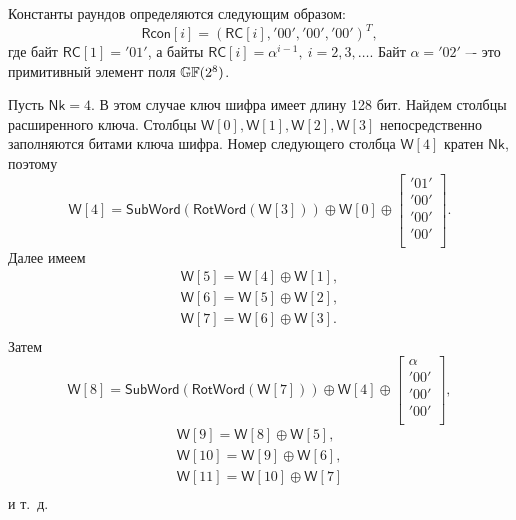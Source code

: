 Константы раундов определяются следующим образом:
    \[ \mathsf{Rcon}[i] = (\mathsf{RC}[i], \mathrm{'00'}, \mathrm{'00'}, \mathrm{'00'})^T, \]
где байт $\mathsf{RC}[1] = \mathrm{'01'}$, а байты $\mathsf{RC}[i] = \alpha^{i-1}, ~ i = 2, 3, \dots$. Байт $\alpha = \mathrm{'02'}$ –- это примитивный элемент поля $\mathbb{GF}(2^8)$.

\example
Пусть $\mathsf{Nk} = 4$. В этом случае ключ шифра имеет длину 128 бит. Найдем столбцы расширенного ключа. Столбцы $\mathsf{W}[0], \mathsf{W}[1], \mathsf{W}[2], \mathsf{W}[3]$ непосредственно заполняются битами ключа шифра. Номер следующего столбца $\mathsf{W}[4]$ кратен $\mathsf{Nk}$, поэтому
\[
    \mathsf{W}[4] = \mathsf{SubWord}(\mathsf{RotWord}(\mathsf{W}[3])) \oplus \mathsf{W}[0] \oplus
        \left[ \begin{array}{c}
            \mathrm{'01'} \\ \mathrm{'00'} \\ \mathrm{'00'} \\ \mathrm{'00'} \\
        \end{array} \right].
\]
Далее имеем
\[
    \begin{array}{l}
        \mathsf{W}[5] = \mathsf{W}[4] \oplus \mathsf{W}[1], \\
        \mathsf{W}[6] = \mathsf{W}[5] \oplus \mathsf{W}[2], \\
        \mathsf{W}[7] = \mathsf{W}[6] \oplus \mathsf{W}[3].  \\
    \end{array}
\]
Затем
\[
    \mathsf{W}[8] = \mathsf{SubWord}(\mathsf{RotWord}(\mathsf{W}[7])) \oplus \mathsf{W}[4] \oplus
        \left[ \begin{array}{c}
            \alpha \\
            \mathrm{'00'}\\
            \mathrm{'00'}\\
            \mathrm{'00'}\\
        \end{array} \right] ,
\] \[
    \begin{array}{l}
        \mathsf{W}[9] = \mathsf{W}[8] \oplus \mathsf{W}[5], \\
        \mathsf{W}[10] = \mathsf{W}[9] \oplus \mathsf{W}[6], \\
        \mathsf{W}[11] = \mathsf{W}[10] \oplus \mathsf{W}[7] \\
    \end{array}
\]
и т.~д.
\exampleend


